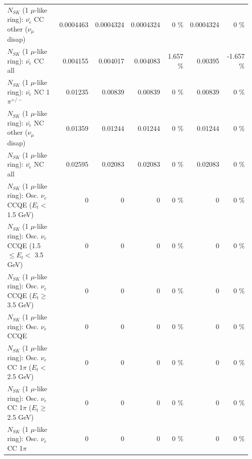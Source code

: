 \begin{table}
\begin{tabular}{| l | r | r | r  r | r  r |}
          $N_{SK}$ (1 $\mu$-like ring): $\bar{\nu_e}$ CC other ($\nu_\mu$ disap) &       0.0004463 &       0.0004324 &       0.0004324 &        0 \%  &       0.0004324 &        0 \%  \\ 
                            $N_{SK}$ (1 $\mu$-like ring): $\bar{\nu_{e}}$ CC all &        0.004155 &        0.004017 &        0.004083 &    1.657 \%  &         0.00395 &   -1.657 \%  \\ 
\hline
                     $N_{SK}$ (1 $\mu$-like ring): $\bar{\nu_e}$ NC 1$\pi^{+/-}$ &         0.01235 &         0.00839 &         0.00839 &        0 \%  &         0.00839 &        0 \%  \\ 
          $N_{SK}$ (1 $\mu$-like ring): $\bar{\nu_e}$ NC other ($\nu_\mu$ disap) &         0.01359 &         0.01244 &         0.01244 &        0 \%  &         0.01244 &        0 \%  \\ 
                            $N_{SK}$ (1 $\mu$-like ring): $\bar{\nu_{e}}$ NC all &         0.02595 &         0.02083 &         0.02083 &        0 \%  &         0.02083 &        0 \%  \\ 
\hline
\hline
\hline
             $N_{SK}$ (1 $\mu$-like ring): Osc. $\nu_e$ CCQE ($E_{t} <$ 1.5 GeV) &               0 &               0 &               0 &        0 \%  &               0 &        0 \%  \\ 
    $N_{SK}$ (1 $\mu$-like ring): Osc. $\nu_e$ CCQE (1.5 $\leq E_{t} <$ 3.5 GeV) &               0 &               0 &               0 &        0 \%  &               0 &        0 \%  \\ 
          $N_{SK}$ (1 $\mu$-like ring): Osc. $\nu_e$ CCQE ($E_{t} \geq$ 3.5 GeV) &               0 &               0 &               0 &        0 \%  &               0 &        0 \%  \\ 
\hline
                                 $N_{SK}$ (1 $\mu$-like ring): Osc. $\nu_e$ CCQE &               0 &               0 &               0 &        0 \%  &               0 &        0 \%  \\ 
\hline
        $N_{SK}$ (1 $\mu$-like ring): Osc. $\nu_e$ CC 1$\pi$ ($E_{t} <$ 2.5 GeV) &               0 &               0 &               0 &        0 \%  &               0 &        0 \%  \\ 
     $N_{SK}$ (1 $\mu$-like ring): Osc. $\nu_e$ CC 1$\pi$ ($E_{t} \geq$ 2.5 GeV) &               0 &               0 &               0 &        0 \%  &               0 &        0 \%  \\ 
\hline
                            $N_{SK}$ (1 $\mu$-like ring): Osc. $\nu_e$ CC 1$\pi$ &               0 &               0 &               0 &        0 \%  &               0 &        0 \%  \\ 

\end{tabular}
\end{table}
